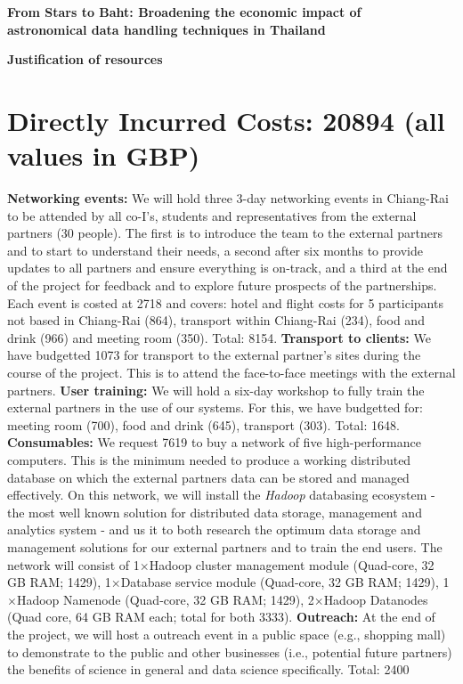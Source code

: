 \documentclass[11pt]{article}
\begin{document}
\setcounter{figure}{0}
\noindent
{\LARGE \bf From Stars to Baht: Broadening the economic impact of \\
astronomical data handling techniques in Thailand}

\vspace{3mm}
\noindent
{\LARGE \bf Justification of resources }
\vspace{-3mm}
\section{Directly Incurred Costs: 20894 (all values in GBP)}
\vspace{-3mm}
{\bf Networking events:} We will hold three 3-day networking events in Chiang-Rai to be attended by all co-I's, students and representatives from the external partners (30 people). The first is to introduce the team to the external partners and to start to understand their needs, a second after six months to provide updates to all partners and ensure everything is on-track, and a third at the end of the project for feedback and to explore future prospects of the partnerships. Each event is costed at 2718 and covers: hotel and flight costs for 5 participants not based in Chiang-Rai (864), transport within Chiang-Rai (234), food and drink (966) and meeting room (350). Total: 8154. {\bf Transport to clients:} We have budgetted 1073 for transport to the external partner's sites during the course of the project. This is to attend the face-to-face meetings with the external partners. {\bf User training:} We will hold a six-day workshop to fully train the external partners in the use of our systems. For this, we have budgetted for: meeting room (700), food and drink (645), transport (303). Total: 1648. {\bf Consumables:} We request 7619 to buy a network of five high-performance computers. This is the minimum needed to produce a working distributed database on which the external partners data can be stored and managed effectively. On this network, we will install the {\it Hadoop} databasing ecosystem - the most well known solution for distributed data storage, management and analytics system - and us it to both research the optimum data storage and management solutions for our external partners and to train the end users. The network will consist of 1$\times$Hadoop cluster management module (Quad-core, 32 GB RAM; 1429), 1$\times$Database service module (Quad-core, 32 GB RAM; 1429), 1$\times$Hadoop Namenode (Quad-core, 32 GB RAM; 1429), 2$\times$Hadoop Datanodes (Quad core, 64 GB RAM each; total for both 3333). {\bf Outreach:} At the end of the project, we will host a outreach event in a public space (e.g., shopping mall) to demonstrate to the public and other businesses (i.e., potential future partners) the benefits of science in general and data science specifically. Total: 2400
\end{document}
